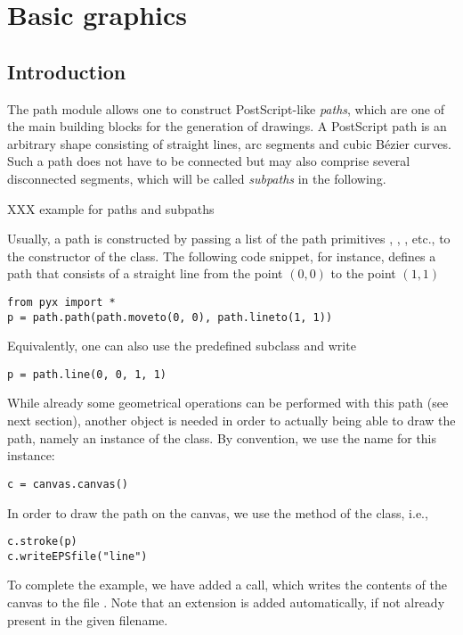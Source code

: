\chapter{Basic graphics}


\label{graphics}

\section{Introduction}

The path module allows one to construct PostScript-like
\textit{paths}, which are one of the main building blocks for the
generation of drawings. A PostScript path is an arbitrary shape
consisting of straight lines, arc segments and cubic B\'ezier curves.
Such a path does not have to be connected but may also comprise
several disconnected segments, which will be called \textit{subpaths}
in the following.

XXX example for paths and subpaths

Usually, a path is constructed by passing a list of the path
primitives , , , etc., to the
constructor of the  class. The following code snippet, for
instance, defines a path  that consists of a straight line
from the point $(0, 0)$ to the point $(1, 1)$
\begin{verbatim}
from pyx import *
p = path.path(path.moveto(0, 0), path.lineto(1, 1))
\end{verbatim}
Equivalently, one can also use the predefined  subclass
 and write
\begin{verbatim}
p = path.line(0, 0, 1, 1)
\end{verbatim}

While already some geometrical operations can be performed with this
path (see next section), another \PyX{} object is needed in order to
actually being able to draw the path, namely an instance of the
 class. By convention, we use the name  for this
instance:
\begin{verbatim}
c = canvas.canvas()
\end{verbatim}
In order to draw the path on the canvas, we use the  method
of the  class, i.e.,
\begin{verbatim}
c.stroke(p)
c.writeEPSfile("line")
\end{verbatim}
To complete the example, we have added a  call,
which writes the contents of the canvas to the file .
Note that an extension  is added automatically, if not
already present in the given filename.

